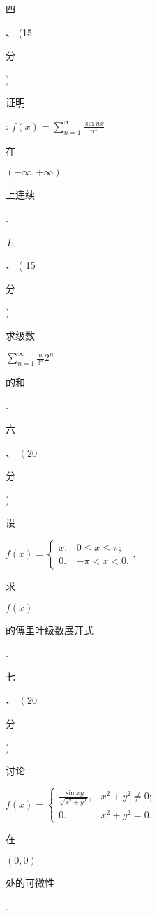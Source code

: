 \documentclass[10pt]{article}
\begin{document}
\begin{CJK}{UTF8}{mj}四\end{CJK}、 (15 \begin{CJK}{UTF8}{mj}分\end{CJK}) \begin{CJK}{UTF8}{mj}证明\end{CJK}: $f(x)=\sum_{n=1}^{\infty} \frac{\sin n x}{n^{3}}$ \begin{CJK}{UTF8}{mj}在\end{CJK} $(-\infty,+\infty)$ \begin{CJK}{UTF8}{mj}上连续\end{CJK}.

\begin{CJK}{UTF8}{mj}五\end{CJK}、 ( 15 \begin{CJK}{UTF8}{mj}分\end{CJK}) \begin{CJK}{UTF8}{mj}求级数\end{CJK} $\sum_{n=1}^{\infty} \frac{n}{3^{n}} 2^{n}$ \begin{CJK}{UTF8}{mj}的和\end{CJK}.

\begin{CJK}{UTF8}{mj}六\end{CJK}、 $\left(20\right.$ \begin{CJK}{UTF8}{mj}分\end{CJK}) \begin{CJK}{UTF8}{mj}设\end{CJK} $f(x)=\left\{\begin{array}{ll}x, & 0 \leqslant x \leqslant \pi ; \\ 0 . & -\pi<x<0 .\end{array}\right.$, \begin{CJK}{UTF8}{mj}求\end{CJK} $f(x)$ \begin{CJK}{UTF8}{mj}的傅里叶级数展开式\end{CJK}.

\begin{CJK}{UTF8}{mj}七\end{CJK}、 $\left(20\right.$ \begin{CJK}{UTF8}{mj}分\end{CJK}) \begin{CJK}{UTF8}{mj}讨论\end{CJK} $f(x)=\left\{\begin{array}{ll}\frac{\sin x y}{\sqrt{x^{2}+y^{2}}}, & x^{2}+y^{2} \neq 0 ; \\ 0 . & x^{2}+y^{2}=0 .\end{array}\right.$ \begin{CJK}{UTF8}{mj}在\end{CJK} $(0,0)$ \begin{CJK}{UTF8}{mj}处的可微性\end{CJK}.
\end{document}
